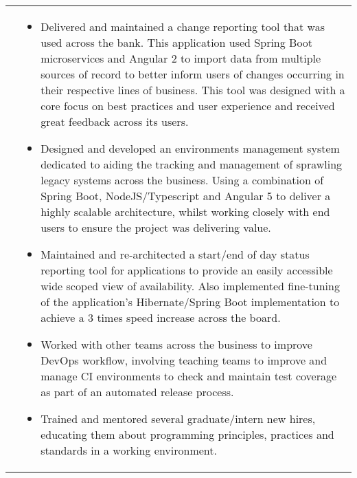 \begin{tabular}{p{60pt}|p{11cm}}
    &\vspace{-0.9em}\begin{itemize}[itemsep=0pt,topsep=0pt,leftmargin=*]
                        \small
                        \item Delivered and maintained a change reporting tool that was used across the bank.
                        This application used Spring Boot microservices and Angular 2 to import data from multiple sources of record to better inform users of changes occurring in their respective lines of business.
                        This tool was designed with a core focus on best practices and user experience and received great feedback across its users.
    \end{itemize}
    \begin{itemize}[itemsep=0pt,topsep=0pt,leftmargin=*]
        \small
        \item Designed and developed an environments management system dedicated to aiding the tracking and management of sprawling legacy systems across the business.
        Using a combination of Spring Boot, NodeJS/Typescript and Angular 5 to deliver a highly scalable architecture, whilst working closely with end users to ensure the project was delivering value.
        \item Maintained and re-architected a start/end of day status reporting tool for applications to provide an easily accessible wide scoped view of availability.
        Also implemented fine-tuning of the application's Hibernate/Spring Boot implementation to achieve a 3 times speed increase across the board.
        \item Worked with other teams across the business to improve DevOps workflow, involving teaching teams to improve and manage CI environments to check and maintain test coverage as part of an automated release process.
        \item Trained and mentored several graduate/intern new hires, educating them about programming principles, practices and standards in a working environment.
    \end{itemize}\vspace{-1.8em}

\end{tabular} \\ \\ \\
